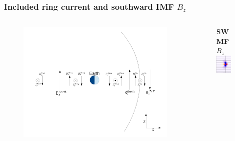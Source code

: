 \begin{frame}
	\frametitle{Included ring current and southward IMF $B_z$}
	\begin{columns}
	\begin{column}{.6\textwidth}
	\begin{figure}
		\includegraphics[scale=.23]{images/SimfRC.pdf}
	\end{figure}
	\end{column}
	\begin{column}{.4\textwidth}
	\begin{figure}
		\textbf{SWMF $B_z$}\\
		\includegraphics[scale=.45]{images/SBzRCM.png}
	\end{figure}
	\end{column}
	\end{columns}
\end{frame}

